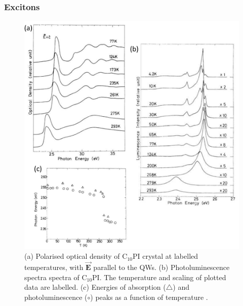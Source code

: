 \subsubsection{Excitons}
\begin{figure}[h!]
\centering
\includegraphics[width=\textwidth]{Fig13}
\caption{(a) Polarised optical density of $\textrm{C}_{10}$PI crystal at labelled temperatures, with $\vec{\mathbf{E}}$ parallel to the QWs. (b) Photoluminescence spectra spectra of $\textrm{C}_{10}$PI. The temperature and scaling of plotted data are labelled. (c) Energies of absorption ($\triangle$) and photoluminescence ($\circ$) peaks as a function of temperature \cite{Ishihara1990}.}
\label{2Fig13}
\end{figure}
